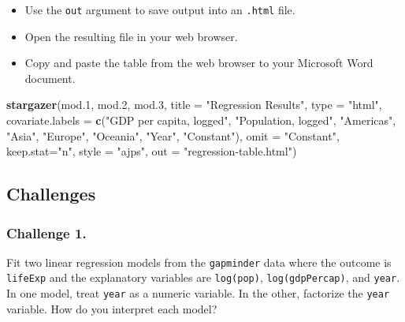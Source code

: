 \documentclass[]{book}
\newenvironment{Shaded}{\begin{snugshade}}{\end{snugshade}}
\newcommand{\KeywordTok}[1]{\textcolor[rgb]{0.13,0.29,0.53}{\textbf{#1}}}
\newcommand{\DataTypeTok}[1]{\textcolor[rgb]{0.13,0.29,0.53}{#1}}
\newcommand{\DecValTok}[1]{\textcolor[rgb]{0.00,0.00,0.81}{#1}}
\newcommand{\StringTok}[1]{\textcolor[rgb]{0.31,0.60,0.02}{#1}}
\newcommand{\NormalTok}[1]{#1}
\providecommand{\tightlist}{%
  \setlength{\itemsep}{0pt}\setlength{\parskip}{0pt}}
\begin{document}
\begin{itemize}
\tightlist
\item
  Use the \texttt{out} argument to save output into an \texttt{.html}
  file.
\item
  Open the resulting file in your web browser.
\item
  Copy and paste the table from the web browser to your Microsoft Word
  document.
\end{itemize}

\begin{Shaded}
\begin{Highlighting}[]
\KeywordTok{stargazer}\NormalTok{(mod.}\DecValTok{1}\NormalTok{, mod.}\DecValTok{2}\NormalTok{, mod.}\DecValTok{3}\NormalTok{, }\DataTypeTok{title =} \StringTok{"Regression Results"}\NormalTok{, }\DataTypeTok{type =} \StringTok{"html"}\NormalTok{, }
          \DataTypeTok{covariate.labels  =} \KeywordTok{c}\NormalTok{(}\StringTok{"GDP per capita, logged"}\NormalTok{, }\StringTok{"Population, logged"}\NormalTok{, }\StringTok{"Americas"}\NormalTok{, }\StringTok{"Asia"}\NormalTok{, }\StringTok{"Europe"}\NormalTok{, }\StringTok{"Oceania"}\NormalTok{, }\StringTok{"Year"}\NormalTok{, }\StringTok{"Constant"}\NormalTok{), }
          \DataTypeTok{omit =} \StringTok{"Constant"}\NormalTok{, }
          \DataTypeTok{keep.stat=}\StringTok{"n"}\NormalTok{, }\DataTypeTok{style =} \StringTok{"ajps"}\NormalTok{,}
          \DataTypeTok{out =} \StringTok{"regression-table.html"}\NormalTok{)}
\end{Highlighting}
\end{Shaded}

\subsection{Challenges}\label{challenges-10}

\subsubsection*{Challenge 1.}\label{challenge-1.-8}

Fit two linear regression models from the \texttt{gapminder} data where
the outcome is \texttt{lifeExp} and the explanatory variables are
\texttt{log(pop)}, \texttt{log(gdpPercap)}, and \texttt{year}. In one
model, treat \texttt{year} as a numeric variable. In the other,
factorize the \texttt{year} variable. How do you interpret each model?
\end{document}
